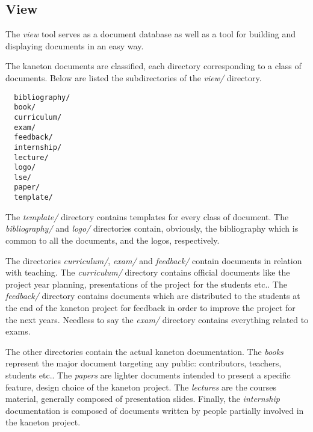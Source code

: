%
%
%
%
%
%

%
%

\subsection{View}
\label{section:view}

The \textit{view} tool serves as a document database as well as a tool for
building and displaying documents in an easy way.

The kaneton documents are classified, each directory corresponding to a
class of documents. Below are listed the subdirectories of the \textit{view/}
directory.

\begin{verbatim}
  bibliography/
  book/
  curriculum/
  exam/
  feedback/
  internship/
  lecture/
  logo/
  lse/
  paper/
  template/
\end{verbatim}

The \textit{template/} directory contains templates for every class of
document. The \textit{bibliography/} and \textit{logo/} directories contain,
obviously, the bibliography which is common to all the documents, and the
logos, respectively.

The directories \textit{curriculum/}, \textit{exam/} and \textit{feedback/}
contain documents in relation with teaching. The \textit{curriculum/}
directory contains official documents like the project year planning,
presentations of the project for the students etc.. The
\textit{feedback/} directory contains documents which are distributed to the
students at the end of the kaneton project for feedback in order to improve
the project for the next years. Needless to say the \textit{exam/} directory
contains everything related to exams.

The other directories contain the actual kaneton documentation. The
\textit{books} represent the major document targeting any public:
contributors, teachers, students etc.. The \textit{papers} are lighter
documents intended to present a specific feature, design choice of the kaneton
project. The \textit{lectures} are the courses material, generally composed of
presentation slides. Finally, the \textit{internship} documentation is
composed of documents written by people partially involved in the kaneton
project.

